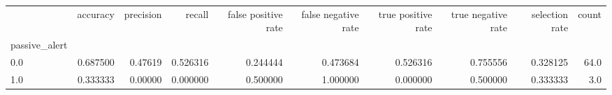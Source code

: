 \begin{tabular}{lrrrrrrrrr}
\toprule
{} &  accuracy &  precision &    recall &  false positive rate &  false negative rate &  true positive rate &  true negative rate &  selection rate &  count \\
passive\_alert &           &            &           &                      &                      &                     &                     &                 &        \\
\midrule
0.0           &  0.687500 &    0.47619 &  0.526316 &             0.244444 &             0.473684 &            0.526316 &            0.755556 &        0.328125 &   64.0 \\
1.0           &  0.333333 &    0.00000 &  0.000000 &             0.500000 &             1.000000 &            0.000000 &            0.500000 &        0.333333 &    3.0 \\
\bottomrule
\end{tabular}
